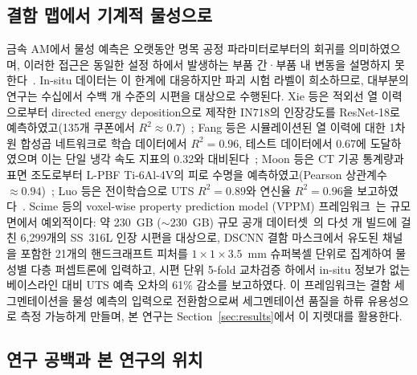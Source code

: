 \subsection{결함 맵에서 기계적 물성으로}
\label{sec:related-property}

금속 AM에서 물성 예측은 오랫동안 명목 공정 파라미터로부터의 회귀를
의미하였으며, 이러한 접근은 동일한 설정 하에서 발생하는 부품 간·부품 내
변동을 설명하지
못한다~\cite{DebRoy2018PMS,DebRoy2021NatRevMater,Mahmoud2021LPBFreview}.
In-situ 데이터는 이 한계에 대응하지만 파괴 시험 라벨이 희소하므로, 대부분의
연구는 수십에서 수백 개 수준의 시편을 대상으로 수행된다. Xie 등은 적외선 열
이력으로부터 directed energy deposition으로 제작한 IN718의 인장강도를
ResNet-18로 예측하였고(135개 쿠폰에서 $R^2 \approx
0.7$)~\cite{Xie2021UTSResNet}; Fang 등은 시뮬레이션된 열 이력에 대한 1차원
합성곱 네트워크로 학습 데이터에서 $R^2 = 0.96$, 테스트 데이터에서 0.67에
도달하였으며 이는 단일 냉각 속도 지표의 0.32와
대비된다~\cite{Fang2022Inconel1DCNN}; Moon 등은 CT 기공 통계량과 표면
조도로부터 L-PBF Ti-6Al-4V의 피로 수명을 예측하였고(Pearson 상관계수
$\approx 0.94$)~\cite{Moon2021Fatigue}; Luo 등은 전이학습으로 UTS $R^2 =
0.89$와 연신율 $R^2 = 0.96$을 보고하였다~\cite{Luo2025TransferTi}. Scime
등의 voxel-wise property prediction model (VPPM)
프레임워크~\cite{VPPM_Baseline}는 규모 면에서 예외적이다: 약 230~GB
(${\sim}230$~GB) 규모 공개 데이터셋~\cite{ORNL_CoRegistered_Dataset}의 다섯
개 빌드에 걸친 6{,}299개의 SS~316L 인장 시편을 대상으로, DSCNN 결함
마스크에서 유도된 채널을 포함한 21개의 핸드크래프트 피처를 $1 \times 1
\times 3.5$~mm 슈퍼복셀 단위로 집계하여 물성별 다층 퍼셉트론에 입력하고,
시편 단위 5-fold 교차검증 하에서 in-situ 정보가 없는 베이스라인 대비 UTS
예측 오차의 61\% 감소를 보고하였다. 이 프레임워크는 결함 세그멘테이션을
물성 예측의 입력으로 전환함으로써 세그멘테이션 품질을 하류 유용성으로 측정
가능하게 만들며, 본 연구는 Section~\ref{sec:results}에서 이 지렛대를
활용한다.

\subsection{연구 공백과 본 연구의 위치}
\label{sec:related-gap}

